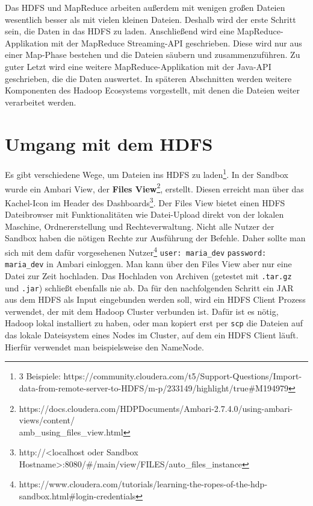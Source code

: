 Das HDFS und MapReduce arbeiten außerdem mit wenigen großen Dateien wesentlich besser als mit vielen kleinen Dateien.\cite[\textit{(S. 19-30, 693-695)}]{white_hadoop_2015} Deshalb wird der erste Schritt sein, die Daten in das HDFS zu laden. Anschließend wird eine MapReduce-Applikation mit der MapReduce Streaming-API geschrieben. Diese wird nur aus einer Map-Phase bestehen und die Dateien säubern und zusammenzuführen. Zu guter Letzt wird eine weitere MapReduce-Applikation mit der Java-API geschrieben, die die Daten auswertet. In späteren Abschnitten werden weitere Komponenten des Hadoop Ecosystems vorgestellt, mit denen die Dateien weiter verarbeitet werden.

\section{Umgang mit dem HDFS}
\label{chap:fund sec:core sub:handson hdfs}
Es gibt verschiedene Wege, um Dateien ins HDFS zu laden\footnote{3 Beispiele: https://community.cloudera.com/t5/Support-Questions/Import-data-from-remote-server-to-HDFS/m-p/233149/highlight/true\#M194979}. In der Sandbox wurde ein Ambari View, der \textbf{Files View}\footnote{https://docs.cloudera.com/HDPDocuments/Ambari-2.7.4.0/using-ambari-views/content/\\amb\_using\_files\_view.html}, erstellt. Diesen erreicht man über das Kachel-Icon im Header des Dashboards\footnote{http://<localhost oder Sandbox Hostname>:8080/\#/main/view/FILES/auto\_files\_instance}. Der Files View bietet einen HDFS Dateibrowser mit Funktionalitäten wie Datei-Upload direkt von der lokalen Maschine, Ordnererstellung und Rechteverwaltung. Nicht alle Nutzer der Sandbox haben die nötigen Rechte zur Ausführung der Befehle. Daher sollte man sich mit dem dafür vorgesehenen Nutzer\footnote{https://www.cloudera.com/tutorials/learning-the-ropes-of-the-hdp-sandbox.html\#login-credentials} \verb|user: maria_dev| \verb|password: maria_dev| in Ambari einloggen. Man kann über den Files View aber nur eine Datei zur Zeit hochladen. Das Hochladen von Archiven (getestet mit \verb|.tar.gz| und \verb|.jar|) schließt ebenfalls nie ab. Da für den nachfolgenden Schritt ein JAR aus dem HDFS als Input eingebunden werden soll, wird ein HDFS Client Prozess verwendet, der mit dem Hadoop Cluster verbunden ist. Dafür ist es nötig, Hadoop lokal installiert zu haben, oder man kopiert erst per \verb|scp| die Dateien auf das lokale Dateisystem eines Nodes im Cluster, auf dem ein HDFS Client läuft. Hierfür verwendet man beispielsweise den NameNode. 
\pagebreak

